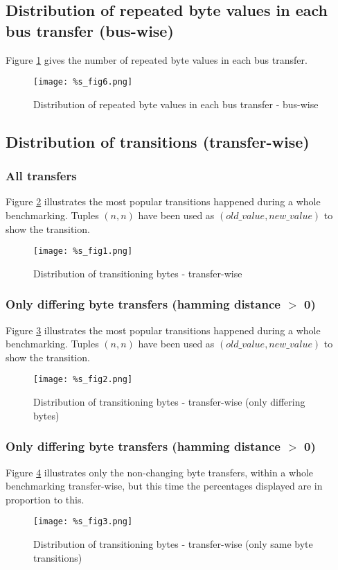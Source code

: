\documentclass[a4paper,12pt]{article}
\begin{document}
\pagebreak
\subsection{Distribution of repeated byte values in each bus transfer (bus-wise)}
Figure \ref{fig_3} gives the number of repeated byte values in each bus transfer.

\begin{figure}[H]
		\centering
		\texttt{[image: \%s\_fig6.png]}
		\caption{Distribution of repeated byte values in each bus transfer - bus-wise}
		\label{fig_3}
\end{figure}	

\pagebreak
\subsection{Distribution of transitions (transfer-wise)}
\subsubsection{All transfers}
Figure \ref{fig_4} illustrates the most popular transitions happened during a whole benchmarking. Tuples $(n,n)$ have been used as $(old\_value, new\_value)$ to show the transition.

\begin{figure}[H]
		\centering
		\texttt{[image: \%s\_fig1.png]}
		\caption{Distribution of transitioning bytes - transfer-wise}
		\label{fig_4}
\end{figure}	

\pagebreak
\subsubsection{Only differing byte transfers (hamming distance $>$ 0)}
Figure \ref{fig_5} illustrates the most popular transitions happened during a whole benchmarking. Tuples $(n,n)$ have been used as $(old\_value, new\_value)$ to show the transition.

\begin{figure}[H]
		\centering
		\texttt{[image: \%s\_fig2.png]}
		\caption{Distribution of transitioning bytes - transfer-wise (only differing bytes)}
		\label{fig_5}
\end{figure}	

\pagebreak
\subsubsection{Only differing byte transfers (hamming distance $>$ 0)}
Figure \ref{fig_6} illustrates only the non-changing byte transfers, within a whole benchmarking transfer-wise, but this time the percentages displayed are in proportion to this.

\begin{figure}[H]
		\centering
		\texttt{[image: \%s\_fig3.png]}
		\caption{Distribution of transitioning bytes - transfer-wise (only same byte transitions)}
		\label{fig_6}
\end{figure}	
\end{document}
